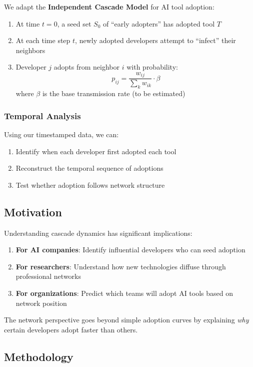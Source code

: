 \documentclass[11pt,letterpaper]{article}
\begin{document}
We adapt the \textbf{Independent Cascade Model} for AI tool adoption:

\begin{enumerate}
    \item At time $t=0$, a seed set $S_0$ of ``early adopters'' has adopted tool $T$
    \item At each time step $t$, newly adopted developers attempt to ``infect'' their neighbors
    \item Developer $j$ adopts from neighbor $i$ with probability:
    \[
    p_{ij} = \frac{w_{ij}}{\sum_k w_{ik}} \cdot \beta
    \]
    where $\beta$ is the base transmission rate (to be estimated)
\end{enumerate}

\subsubsection{Temporal Analysis}

Using our timestamped data, we can:
\begin{enumerate}
    \item Identify when each developer first adopted each tool
    \item Reconstruct the temporal sequence of adoptions
    \item Test whether adoption follows network structure
\end{enumerate}

\subsection{Motivation}

Understanding cascade dynamics has significant implications:

\begin{enumerate}
    \item \textbf{For AI companies}: Identify influential developers who can seed adoption
    \item \textbf{For researchers}: Understand how new technologies diffuse through professional networks
    \item \textbf{For organizations}: Predict which teams will adopt AI tools based on network position
\end{enumerate}

The network perspective goes beyond simple adoption curves by explaining \textit{why} certain developers adopt faster than others.

\subsection{Methodology}
\end{document}

